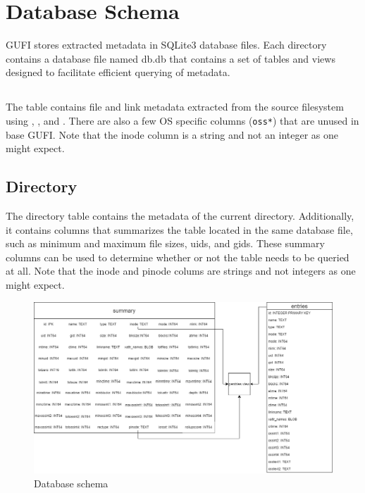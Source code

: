 \section{Database Schema}
\label{sec:schema}
GUFI stores extracted metadata in SQLite3 database files. Each
directory contains a database file named db.db that contains a set of
tables and views designed to facilitate efficient querying of
metadata.

\subsection{\entries}
The \entries table contains file and link metadata extracted from the
source filesystem using \stat, \readlink, and \listxattr. There are
also a few OS specific columns (\texttt{oss*}) that are unused in
base GUFI. Note that the inode column is a string and not an integer
as one might expect.

\subsection{Directory \summary}
The directory \summary table contains the metadata of the current
directory. Additionally, it contains columns that summarizes the
\entries table located in the same database file, such as minimum and
maximum file sizes, uids, and gids. These summary columns can be used
to determine whether or not the \entries table needs to be queried
at all. Note that the inode and pinode colums are strings and not
integers as one might expect.

\begin{figure} [h!]
\centering
\includegraphics[width=1.0\textwidth]{images/Database_Schemas.png}
\caption{\label{fig:Database Schema}Database schema}
\end{figure}

